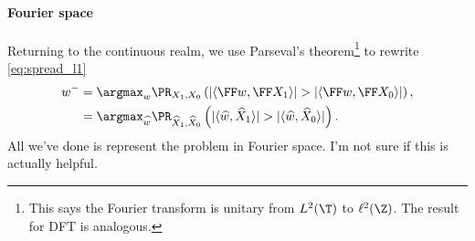 \documentclass{article}
\begin{document}
\paragraph*{Fourier space}
Returning to the continuous realm, we use Parseval's theorem\footnote{This says the Fourier transform is unitary from $L^2(\T)$ to $\ell^2(\Z)$. The result for DFT is analogous.} to rewrite \cref{eq:spread_l1}
\begin{align}
  w^-
  &= \argmax_{w} \PR_{X_1, X_0} \left( |\langle \FF w, \FF X_1 \rangle| > |\langle \FF w, \FF X_0 \rangle| \right), \\
  &= \argmax_{\widehat{w}} \PR_{\widehat{X}_1, \widehat{X}_0} \left( |\langle \widehat{w}, \widehat{X}_1 \rangle| > |\langle \widehat{w}, \widehat{X}_0 \rangle| \right).
\end{align}
All we've done is represent the problem in Fourier space.
I'm not sure if this is actually helpful.

\end{document}
